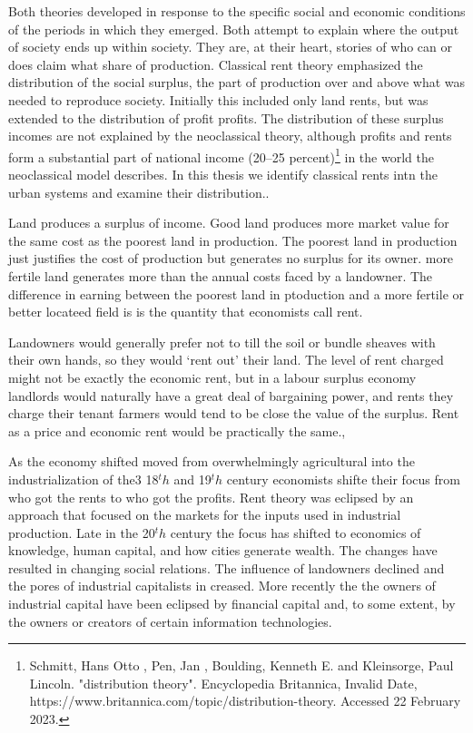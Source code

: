Both theories developed in response to the specific social and economic conditions of the periods in which they emerged. Both attempt to explain where the output of society ends up within society. They are, at their heart, stories of who  can or does claim what share of production.  Classical rent theory  emphasized the distribution of the social surplus, the part of production  over and above what was needed to reproduce society. Initially this included only land rents, but was extended to the distribution of profit profits.  The distribution of these surplus incomes are not explained by the neoclassical theory, although profits and rents form a substantial part of national income (20–25 percent)\footnote{Schmitt, Hans Otto , Pen, Jan , Boulding, Kenneth E. and Kleinsorge, Paul Lincoln. "distribution theory". Encyclopedia Britannica, Invalid Date, https://www.britannica.com/topic/distribution-theory. Accessed 22 February 2023.} in the world the neoclassical model describes. In this thesis we identify classical rents intn the urban systems and examine their distribution.. 


 Land produces a surplus of income. Good land produces more market value for the same cost as the poorest land in production. The poorest land in production  just justifies the cost of production but generates no surplus for its owner. more fertile land  generates more than the annual costs faced by a landowner. The difference in earning between the poorest land in ptoduction and a more fertile or better locateed field is is the quantity that economists call rent. 
 
 Landowners would generally prefer not to till the soil or bundle sheaves with their own hands, so they would `rent out' their land. The level of rent charged might not be exactly the economic rent, but in a labour surplus economy landlords would naturally have a great deal of bargaining power, and rents they charge their tenant farmers would tend to be close the value of the surplus. Rent as a price and economic rent would be practically the same.,


 As the economy shifted  moved from overwhelmingly  agricultural into the industrialization of the3 18$^th$  and 19$^th$ century economists shifte their focus from who got the rents to who got the  profits. Rent theory was eclipsed by an approach that focused on the markets for the inputs used in industrial production.  Late in the 20$^th$ century the focus has shifted to economics of  knowledge, human capital, and how cities generate wealth. The changes have resulted in changing social relations. The influence of landowners declined and the pores of  industrial capitalists in creased. More recently the the owners of industrial capital have been eclipsed  by financial capital and, to some extent, by the owners or creators of certain information technologies.


